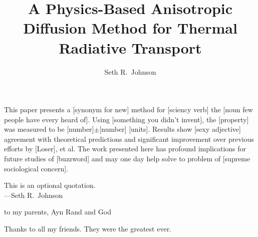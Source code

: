 \documentclass[12pt, letterpaper]{umthesis}
\author{Seth R.~Johnson}
\title{A Physics-Based Anisotropic Diffusion Method for Thermal Radiative Transport}
\begin{document}
\frontmatter

\maketitle

\begin{finalabstract}
  This paper presents a [synonym for new] method for [sciency verb] the [noun
  few people have every heard of]. Using [something you didn't invent],
  the [property] was measured to be [number]$\pm$[number] [units].
  Results show [sexy adjective] agreement with theoretical predictions and
  significant improvement over previous efforts by [Loser], et al. The work
  presented here has profound implications for future studies of [buzzword] and
  may one day help solve to problem of [supreme sociological concern].
\end{finalabstract}
\makecopyright

\begin{frontispiece}
  This is an optional quotation.\\
  ---Seth R.~Johnson
\end{frontispiece}

\begin{dedication}
  to my parents, Ayn Rand and God
\end{dedication}

\begin{acknowledgments}
  Thanks to all my friends. They were the greatest ever.
\end{acknowledgments}


\tableofcontents
\listoftables
\listoffigures
\listofappendices


\mainmatter


%
%
%
%

%


%

\backmatter


\end{document}
